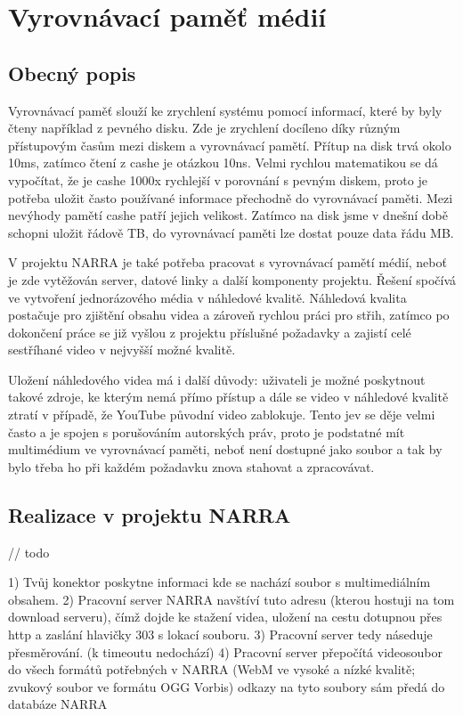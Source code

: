 \section{Vyrovnávací paměť médií}
\subsection{Obecný popis}
\par Vyrovnávací paměť slouží ke zrychlení systému pomocí  informací, které by byly čteny například z pevného disku. Zde je zrychlení docíleno díky různým přístupovým časům mezi diskem a vyrovnávací pamětí. Přítup na disk trvá okolo 10ms, zatímco čtení z cashe je otázkou 10ns. Velmi rychlou matematikou se dá vypočítat, že je cashe 1000x rychlejší v porovnání s pevným diskem, proto je potřeba uložit často používané informace přechodně do vyrovnávací paměti. Mezi nevýhody pamětí cashe patří jejich velikost. Zatímco na disk jsme v dnešní době schopni uložit řádově TB, do vyrovnávací paměti lze dostat pouze data řádu MB.
\par V projektu NARRA je také potřeba pracovat s vyrovnávací pamětí médií, neboť je zde vytěžován server, datové linky a další komponenty projektu. Řešení spočívá ve vytvoření jednorázového média v náhledové kvalitě. Náhledová kvalita postačuje pro zjištění obsahu videa a zároveň rychlou práci pro střih, zatímco po dokončení práce se již vyšlou z projektu příslušné požadavky a zajistí celé sestříhané video v nejvyšší možné kvalitě.
\par Uložení náhledového videa má i další důvody: uživateli je možné poskytnout takové zdroje, ke kterým nemá přímo přístup a dále se video v náhledové kvalitě ztratí v případě, že YouTube původní video zablokuje. Tento jev se děje velmi často a je spojen s porušováním autorských práv, proto je podstatné mít multimédium ve vyrovnávací paměti, neboť není dostupné jako soubor a tak by bylo třeba ho při každém požadavku znova stahovat a zpracovávat.

\subsection{Realizace v projektu NARRA}
\par // todo

1) Tvůj konektor poskytne informaci kde se nachází soubor s multimediálním obsahem.
2) Pracovní server NARRA navštíví tuto adresu (kterou hostuji na tom download serveru), čímž dojde ke stažení videa, uložení na cestu dotupnou přes http a zaslání hlavičky 303 s lokací souboru.
3) Pracovní server tedy náseduje přesměrování. (k timeoutu nedochází)
4) Pracovní server přepočítá videosoubor do všech formátů potřebných v NARRA (WebM ve vysoké a nízké kvalitě; zvukový soubor ve formátu OGG Vorbis) odkazy na tyto soubory sám předá do databáze NARRA

